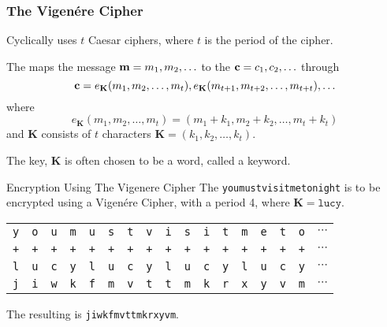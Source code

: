 \subsubsection{The Vigen\'{e}re Cipher}\label{subsubsec:The_Vigenere_Cipher}
Cyclically uses $t$ Caesar ciphers, where $t$ is the period of the cipher.

The  maps the  message $\operatorname{\mathbf{m}} = m_{1},m_{2},\ldots$ to the  $\operatorname{\mathbf{c}} = c_{1},c_{2},\ldots$ through
\begin{equation}\label{eq:The_Vigenere_Cipher-Encryption}
  \operatorname{\mathbf{c}} = e_{\mathbf{K}} (m_{1}, m_{2}, \ldots, m_{t} ), e_{\mathbf{K}} (m_{t+1}, m_{t+2}, \ldots, m_{t+t}),\ldots
\end{equation}
where
\begin{equation*}
  e_{\mathbf{K}} (m_{1}, m_{2}, \ldots, m_{t}) = (m_{1}+k_{1}, m_{2}+k_{2}, \ldots, m_{t}+k_{t})
\end{equation*}
and $\mathbf{K}$ consists of $t$ characters $\mathbf{K} = (k_{1}, k_{2}, \ldots, k_{t})$.

\begin{remark*}
  The key, $\mathbf{K}$ is often chosen to be a word, called a keyword.
\end{remark*}

\begin{example}[Lecture 4]{Encryption Using The Vigenere Cipher}
  The  \texttt{youmustvisitmetonight} is to be encrypted using a Vigen\'{e}re Cipher, with a period 4, where $\mathbf{K} = \mathtt{lucy}$.
  \tcblower{}
  \begin{center}
    \begin{tabular}{ccccccccccccccccc}
      \toprule
      \texttt{y} &  \texttt{o} &  \texttt{u} &  \texttt{m} &  \texttt{u} &  \texttt{s} &  \texttt{t} &  \texttt{v} &  \texttt{i} &  \texttt{s} &  \texttt{i} &  \texttt{t} &  \texttt{m} &  \texttt{e} &  \texttt{t} &  \texttt{o} &  $\cdots$ \\
      \texttt{+} &  \texttt{+} &  \texttt{+} &  \texttt{+} &  \texttt{+} &  \texttt{+} &  \texttt{+} &  \texttt{+} &  \texttt{+} &  \texttt{+} &  \texttt{+} &  \texttt{+} &  \texttt{+} &  \texttt{+} &  \texttt{+} &  \texttt{+} &  $\cdots$ \\
      \texttt{l} &  \texttt{u} &  \texttt{c} &  \texttt{y} &  \texttt{l} &  \texttt{u} &  \texttt{c} &  \texttt{y} &  \texttt{l} &  \texttt{u} &  \texttt{c} &  \texttt{y} &  \texttt{l} &  \texttt{u} &  \texttt{c} &  \texttt{y} &  $\cdots$ \\
      \midrule
      \texttt{j} &  \texttt{i} &  \texttt{w} &  \texttt{k} &  \texttt{f} &  \texttt{m} &  \texttt{v} &  \texttt{t} &  \texttt{t} &  \texttt{m} &  \texttt{k} &  \texttt{r} &  \texttt{x} &  \texttt{y} &  \texttt{v} &  \texttt{m} &  $\cdots$ \\
      \bottomrule
    \end{tabular}
  \end{center}

  The resulting  is \texttt{jiwkfmvttmkrxyvm}.
\end{example}

